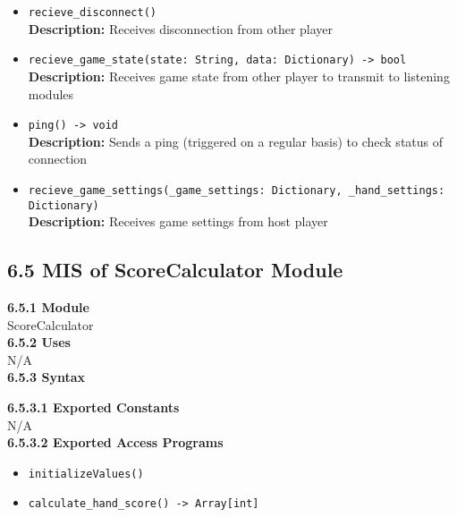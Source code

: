\documentclass[12pt, titlepage]{article}
\begin{document}
\begin{itemize}
    \item \texttt{recieve\_disconnect()}\\
    \textbf{Description:} Receives disconnection from other player
    
    \item \texttt{recieve\_game\_state(state: String, data: Dictionary) -> bool}\\
    \textbf{Description:} Receives game state from other player to transmit to listening modules
    
    \item \texttt{ping() -> void}\\
    \textbf{Description:} Sends a ping (triggered on a regular basis) to check status of connection
    
    \item \texttt{recieve\_game\_settings(\_game\_settings: Dictionary, \_hand\_settings: Dictionary)}\\
    \textbf{Description:} Receives game settings from host player
\end{itemize}


\subsection*{6.5 MIS of ScoreCalculator Module}
\textbf{6.5.1 Module}\\
 ScoreCalculator\\

\noindent \textbf{6.5.2 Uses}\\

N/A \\

\noindent \textbf{6.5.3 Syntax}

\noindent \textbf{6.5.3.1 Exported Constants}\\

 \noindent N/A\\

\textbf{6.5.3.2 Exported Access Programs}
\begin{itemize}
	\item \texttt{initializeValues()}
	\item \texttt{calculate\_hand\_score() -> Array[int]}
	
\end{itemize}
\end{document}
